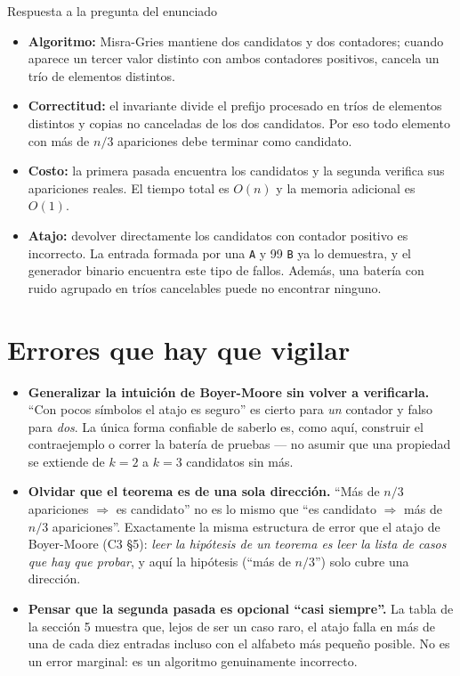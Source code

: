 \documentclass[11pt]{article}
\begin{document}
\begin{resultado}{Respuesta a la pregunta del enunciado}
\begin{itemize}[leftmargin=14pt]
\item \textbf{Algoritmo:} Misra-Gries mantiene dos candidatos y dos contadores; cuando aparece un tercer
valor distinto con ambos contadores positivos, cancela un trío de elementos distintos.
\item \textbf{Correctitud:} el invariante divide el prefijo procesado en tríos de elementos distintos y
copias no canceladas de los dos candidatos. Por eso todo elemento con más de $n/3$ apariciones debe terminar
como candidato.
\item \textbf{Costo:} la primera pasada encuentra los candidatos y la segunda verifica sus apariciones
reales. El tiempo total es $O(n)$ y la memoria adicional es $O(1)$.
\item \textbf{Atajo:} devolver directamente los candidatos con contador positivo es incorrecto. La entrada
formada por una \texttt{A} y 99 \texttt{B} ya lo demuestra, y el generador binario encuentra este tipo de
fallos. Además, una batería con ruido agrupado en tríos cancelables puede no encontrar ninguno.
\end{itemize}
\end{resultado}

\section*{Errores que hay que vigilar}

\begin{alerta}{}
\begin{itemize}[leftmargin=14pt]
\item \textbf{Generalizar la intuición de Boyer-Moore sin volver a verificarla.} ``Con pocos símbolos el
atajo es seguro'' es cierto para \emph{un} contador y falso para \emph{dos}. La única forma confiable de
saberlo es, como aquí, construir el contraejemplo o correr la batería de pruebas --- no asumir que una
propiedad se extiende de $k=2$ a $k=3$ candidatos sin más.
\item \textbf{Olvidar que el teorema es de una sola dirección.} ``Más de $n/3$ apariciones $\Rightarrow$
es candidato'' no es lo mismo que ``es candidato $\Rightarrow$ más de $n/3$ apariciones''. Exactamente la
misma estructura de error que el atajo de Boyer-Moore (C3 §5): \emph{leer la hipótesis de un teorema es
leer la lista de casos que hay que probar}, y aquí la hipótesis (``más de $n/3$'') solo cubre una dirección.
\item \textbf{Pensar que la segunda pasada es opcional ``casi siempre''.} La tabla de la sección 5 muestra
que, lejos de ser un caso raro, el atajo falla en más de una de cada diez entradas incluso con el alfabeto
más pequeño posible. No es un error marginal: es un algoritmo genuinamente incorrecto.
\end{itemize}
\end{alerta}
\end{document}
